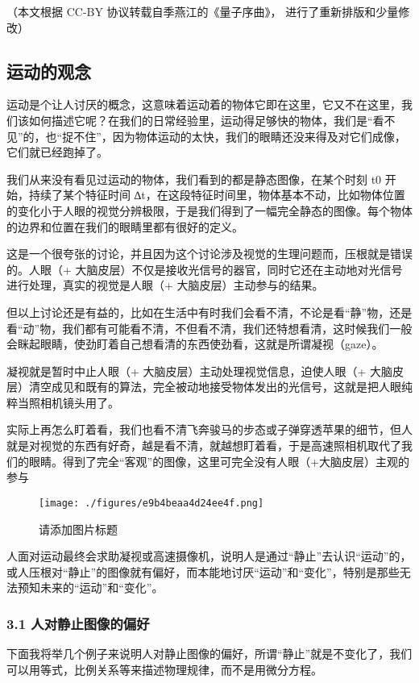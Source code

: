 
（本文根据 CC-BY 协议转载自季燕江的《量子序曲》， 进行了重新排版和少量修改）

\subsection{运动的观念}
运动是个让⼈讨厌的概念，这意味着运动着的物体它即在这里，它又不在这里，我们该如何描述它呢？在我们的日常经验里，运动得⾜够快的物体，我们是“看不见”的，也“捉不住”，因为物体运动的太快，我们的眼睛还没来得及对它们成像，它们就已经跑掉了。

我们从来没有看见过运动的物体，我们看到的都是静态图像，在某个时刻 t0 开始，持续了某个特征时间 ∆t，在这段特征时间里，物体基本不动，比如物体位置的变化小于⼈眼的视觉分辨极限，于是我们得到了⼀幅完全静态的图像。每个物体的边界和位置在我们的眼睛里都有很好的定义。

这是⼀个很夸张的讨论，并且因为这个讨论涉及视觉的⽣理问题⽽，压根就是错误的。⼈眼（+ ⼤脑皮层）不仅是接收光信号的器官，同时它还在主动地对光信号进⾏处理，真实的视觉是⼈眼（+ ⼤脑皮层）主动参与的结果。

但以上讨论还是有益的，比如在⽣活中有时我们会看不清，不论是看“静”物，还是看“动”物，我们都有可能看不清，不但看不清，我们还特想看清，这时候我们⼀般会眯起眼睛，使劲盯着自⼰想看清的东西使劲看，这就是所谓凝视（gaze）。

凝视就是暂时中⽌⼈眼（+ ⼤脑皮层）主动处理视觉信息，迫使⼈眼（+ ⼤脑皮层）清空成见和既有的算法，完全被动地接受物体发出的光信号，这就是把⼈眼纯粹当照相机镜头用了。

实际上再怎么盯着看，我们也看不清飞奔骏马的步态或⼦弹穿透苹果的细节，但⼈就是对视觉的东西有好奇，越是看不清，就越想盯着看，于是⾼速照相机取代了我们的眼睛。得到了完全“客观”的图像，这里可完全没有⼈眼（+⼤脑皮层）主观的参与
\begin{figure}[ht]
\centering
\texttt{[image: ./figures/e9b4beaa4d24ee4f.png]}
\caption{请添加图片标题} \label{fig_AtomId_10}
\end{figure}

⼈面对运动最终会求助凝视或⾼速摄像机，说明⼈是通过“静⽌”去认识“运动”的，或⼈压根对“静⽌”的图像就有偏好，⽽本能地讨厌“运动”和“变化”，特别是那些⽆法预知未来的“运动”和“变化”。

\subsubsection{3.1 人对静止图像的偏好}
下面我将举⼏个例⼦来说明⼈对静⽌图像的偏好，所谓“静⽌”就是不变化了，我们可以用等式，比例关系等来描述物理规律，⽽不是用微分⽅程。

